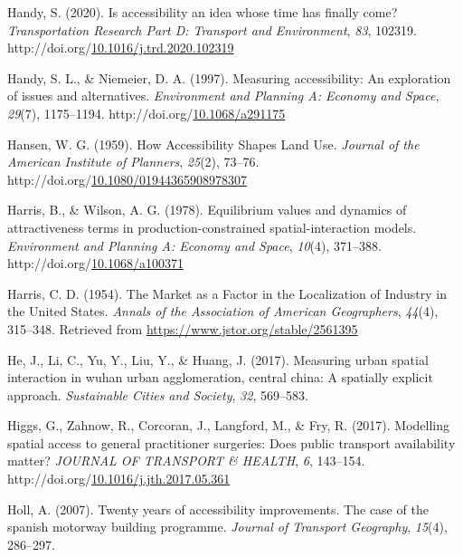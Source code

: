 \documentclass[
11pt, %
oneside, %
english, %
singlespacing, %
]{macthesis} %
\newlength{\cslhangindent}
\newenvironment{CSLReferences}[2] %
{\begin{list}{}{%
	\setlength{\itemindent}{0pt}
	\setlength{\leftmargin}{0pt}
	\setlength{\parsep}{0pt}
	\ifodd #1
	\setlength{\leftmargin}{\cslhangindent}
	\setlength{\itemindent}{-1\cslhangindent}
	\fi
	\setlength{\itemsep}{#2\baselineskip}}}
{\end{list}}
\begin{document}
\begin{CSLReferences}{1}{0}
Handy, S. (2020). Is accessibility an idea whose time has finally come? \emph{Transportation Research Part D: Transport and Environment}, \emph{83}, 102319. http://doi.org/\href{https://doi.org/10.1016/j.trd.2020.102319}{10.1016/j.trd.2020.102319}

Handy, S. L., \& Niemeier, D. A. (1997). Measuring accessibility: An exploration of issues and alternatives. \emph{Environment and Planning A: Economy and Space}, \emph{29}(7), 1175--1194. http://doi.org/\href{https://doi.org/10.1068/a291175}{10.1068/a291175}

Hansen, W. G. (1959). How Accessibility Shapes Land Use. \emph{Journal of the American Institute of Planners}, \emph{25}(2), 73--76. http://doi.org/\href{https://doi.org/10.1080/01944365908978307}{10.1080/01944365908978307}

Harris, B., \& Wilson, A. G. (1978). Equilibrium values and dynamics of attractiveness terms in production-constrained spatial-interaction models. \emph{Environment and Planning A: Economy and Space}, \emph{10}(4), 371--388. http://doi.org/\href{https://doi.org/10.1068/a100371}{10.1068/a100371}

Harris, C. D. (1954). The {Market} as a {Factor} in the {Localization} of {Industry} in the {United} {States}. \emph{Annals of the Association of American Geographers}, \emph{44}(4), 315--348. Retrieved from \url{https://www.jstor.org/stable/2561395}

He, J., Li, C., Yu, Y., Liu, Y., \& Huang, J. (2017). Measuring urban spatial interaction in wuhan urban agglomeration, central china: A spatially explicit approach. \emph{Sustainable Cities and Society}, \emph{32}, 569--583.

Higgs, G., Zahnow, R., Corcoran, J., Langford, M., \& Fry, R. (2017). Modelling spatial access to general practitioner surgeries: Does public transport availability matter? \emph{{JOURNAL} {OF} {TRANSPORT} \& {HEALTH}}, \emph{6}, 143--154. http://doi.org/\href{https://doi.org/10.1016/j.jth.2017.05.361}{10.1016/j.jth.2017.05.361}

Holl, A. (2007). Twenty years of accessibility improvements. The case of the spanish motorway building programme. \emph{Journal of Transport Geography}, \emph{15}(4), 286--297.


\end{CSLReferences}
\end{document}
